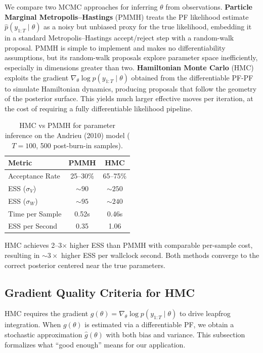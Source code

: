 \documentclass[12pt,a4paper]{article}
\theoremstyle{definition}
\theoremstyle{remark}
\begin{document}
We compare two MCMC approaches for inferring $\theta$ from observations. \textbf{Particle Marginal Metropolis--Hastings} (PMMH) \citep{andrieu2010} treats the PF likelihood estimate $\hat{p}(y_{1:T} \mid \theta)$ as a noisy but unbiased proxy for the true likelihood, embedding it in a standard Metropolis--Hastings accept/reject step with a random-walk proposal. PMMH is simple to implement and makes no differentiability assumptions, but its random-walk proposals explore parameter space inefficiently, especially in dimensions greater than two. \textbf{Hamiltonian Monte Carlo} (HMC) \citep{neal2011} exploits the gradient $\nabla_\theta \log p(y_{1:T} \mid \theta)$ obtained from the differentiable PF-PF to simulate Hamiltonian dynamics, producing proposals that follow the geometry of the posterior surface. This yields much larger effective moves per iteration, at the cost of requiring a fully differentiable likelihood pipeline.

\begin{table}[H]
	\centering
	\caption{HMC vs PMMH for parameter inference on the Andrieu (2010) model ($T=100$, 500 post-burn-in samples).}
	\label{tab:hmc-pmmh}
	\begin{tabular}{@{}lcc@{}}
		\toprule
		\textbf{Metric} & \textbf{PMMH} & \textbf{HMC} \\
		\midrule
		Acceptance Rate & 25--30\% & 65--75\% \\
		ESS ($\sigma_V$) & $\sim 90$ & $\sim 250$ \\
		ESS ($\sigma_W$) & $\sim 95$ & $\sim 240$ \\
		Time per Sample & 0.52s & 0.46s \\
		ESS per Second & 0.35 & 1.06 \\
		\bottomrule
	\end{tabular}
\end{table}

HMC achieves 2--3$\times$ higher ESS than PMMH with comparable per-sample cost, resulting in $\sim 3\times$ higher ESS per wallclock second. Both methods converge to the correct posterior centered near the true parameters.

\subsection{Gradient Quality Criteria for HMC}
\label{sec:gradient-criteria}

HMC requires the gradient $g(\theta) = \nabla_\theta \log p(y_{1:T} \mid \theta)$ to drive leapfrog integration. When $g(\theta)$ is estimated via a differentiable PF, we obtain a stochastic approximation $\hat{g}(\theta)$ with both bias and variance. This subsection formalizes what ``good enough'' means for our application.
\end{document}
